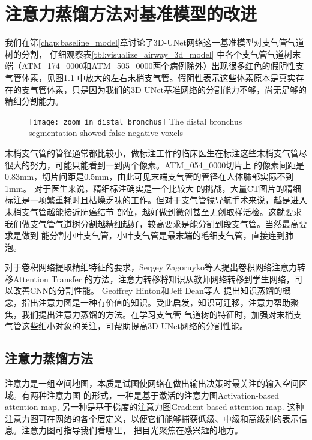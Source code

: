 
\chapter{注意力蒸馏方法对基准模型的改进}\label{chap:attention_distillation}

我们在第\ref{chap:baseline_model}章讨论了3D-UNet网络这一基准模型对支气管气道树的分割， 仔细观察表\ref{tbl:visualize_airway_3d_model}
中各个支气管气道树末端（ATM\_174\_0000和ATM\_505\_0000两个病例除外）出现很多红色的假阴性支气管体素，见图\ref{fig:distal_bronchus}
中放大的左右末梢支气管。假阴性表示这些体素原本是真实存在的支气管体素，只是因为我们的3D-UNet基准网络的分割能力不够，尚无足够的精细分割能力。
\begin{figure}[!htp]
    \centering
    \texttt{[image: zoom\_in\_distal\_bronchus]}
        {The distal bronchus segmentation showed false-negative voxels}
    \label{fig:distal_bronchus}
\end{figure}
末梢支气管的管径通常都比较小，做标注工作的临床医生在标注这些末梢支气管尽很大的努力，可能只能看到一到两个像素。ATM\_054\_0000切片上
的像素间距是0.83mm，切片间距是0.5mm，由此可见末端支气管的管径在人体肺部实际不到1mm。 对于医生来说，精细标注确实是一个比较大
的挑战，大量CT图片的精细标注是一项繁重耗时且枯燥乏味的工作。但对于支气管镜导航手术来说，越是进入末梢支气管越能接近肺癌结节
部位，越好做到微创甚至无创取样活检。这就要求我们做支气管气道树分割越精细越好，较高要求是能分割到段支气管。当然最高要求是做到
能分割小叶支气管，小叶支气管是最末端的毛细支气管，直接连到肺泡。

对于卷积网络提取精细特征的要求，Sergey Zagoruyko等人\cite{Zagoruyko2016PayingMA}提出卷积网络注意力转移Attention Transfer
的方法，注意力转移将知识从教师网络转移到学生网络，可以改善CNN的分割性能。 Geoffrey Hinton和Jeff Dean等人\cite{Hinton2015DistillingTK}
提出知识蒸馏的概念，指出注意力图是一种有价值的知识。受此启发，知识可迁移，注意力帮助聚焦，我们提出注意力蒸馏的方法。在学习支气管
气道树的特征时，加强对末梢支气管这些细小对象的关注，可帮助提高3D-UNet网络的分割性能。

\section{注意力蒸馏方法}

注意力是一组空间地图，本质是试图使网络在做出输出决策时最关注的输入空间区域\cite{Zagoruyko2016PayingMA}。有两种注意力图
的形式，一种是基于激活的注意力图Activation-based attention map, 另一种是基于梯度的注意力图Gradient-based 
attention map. 这种注意力图可在网络的各个层定义，以便它们能够捕获低级、中级和高级别的表示信息。注意力图可指导我们看哪里，
把目光聚焦在感兴趣的地方。 

